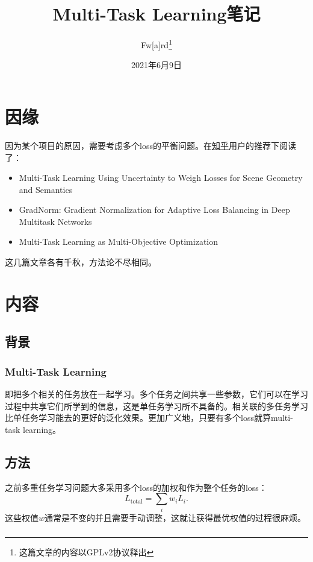 \documentclass{ctexart}
\title{Multi-Task Learning笔记}
\author{Fw[a]rd\thanks{这篇文章的内容以GPLv2协议释出}}
\date{2021年6月9日}
\begin{document}
\maketitle

\section{因缘}
因为某个项目的原因，需要考虑多个loss的平衡问题。在\href{https://www.zhihu.com/question/375794498}{知乎}用户的推荐下阅读了：

\begin{itemize}
    \item Multi-Task Learning Using Uncertainty to Weigh Losses for Scene Geometry and Semantics\cite{Kendall18Uncertainty}
    \item GradNorm: Gradient Normalization for Adaptive Loss Balancing in Deep Multitask Networks\cite{Chen18GradNorm}
    \item Multi-Task Learning as Multi-Objective Optimization\cite{Sener18Pareto}
\end{itemize}

这几篇文章各有千秋，方法论不尽相同。

\section{内容}
\subsection{背景}
\subsubsection{Multi-Task Learning}
即把多个相关的任务放在一起学习。多个任务之间共享一些参数，它们可以在学习过程中共享它们所学到的信息，这是单任务学习所不具备的。相关联的多任务学习比单任务学习能去的更好的泛化效果。更加广义地，只要有多个loss就算multi-task learning。

\subsection{方法}

之前多重任务学习问题大多采用多个loss的加权和作为整个任务的loss：
\begin{equation}
    L_\mathrm{total} = \sum_i w_iL_i.
\end{equation}
这些权值$w$通常是不变的并且需要手动调整，这就让获得最优权值的过程很麻烦。

\subsubsection{}
\end{document}
